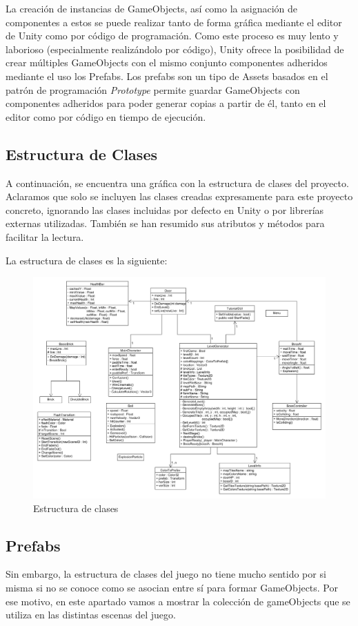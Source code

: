 La creación de instancias de GameObjects, así como la asignación de componentes a estos se puede realizar tanto de forma gráfica mediante el editor de Unity como por código de programación. Como este proceso es muy lento y laborioso (especialmente realizándolo por código), Unity ofrece la posibilidad de crear múltiples GameObjects con el mismo conjunto componentes adheridos mediante el uso los Prefabs. Los prefabs son un tipo de Assets basados en el patrón de programación \textit{Prototype}\cite{game_programming_patterns} permite guardar GameObjects con componentes adheridos para poder generar copias a partir de él, tanto en el editor como por código en tiempo de ejecución. 

\subsection{Estructura de Clases}
A continuación, se encuentra una gráfica con la estructura de clases del proyecto. Aclaramos que solo se incluyen las clases creadas expresamente para este proyecto concreto, ignorando las clases incluidas por defecto en Unity o por librerías externas utilizadas. También se han resumido sus atributos y métodos para facilitar la lectura.

\clearpage 
La estructura de clases es la siguiente:
\begin{figure}[h]
	\includegraphics[width=1\textwidth]{images/estructura/clases/classes}
	\centering
	\caption{Estructura de clases}
\end{figure}

\subsection{Prefabs}
Sin embargo, la estructura de clases del juego no tiene mucho sentido por si misma si no se conoce como se asocian entre sí para formar GameObjects. Por ese motivo, en este apartado vamos a mostrar la colección de gameObjects que se utiliza en las distintas escenas del juego.

